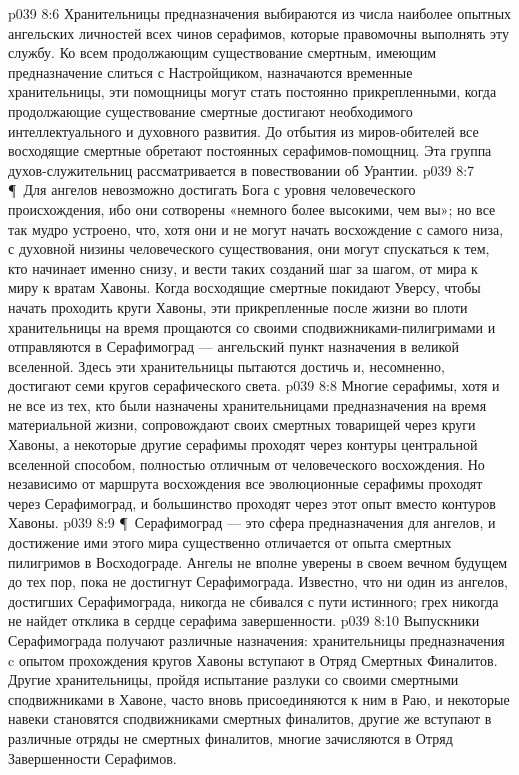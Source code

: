 \vs p039 8:6 Хранительницы предназначения выбираются из числа наиболее опытных ангельских личностей всех чинов серафимов, которые правомочны выполнять эту службу. Ко всем продолжающим существование смертным, имеющим предназначение слиться с Настройщиком, назначаются временные хранительницы, эти помощницы могут стать постоянно прикрепленными, когда продолжающие существование смертные достигают необходимого интеллектуального и духовного развития. До отбытия из миров\hyp{}обителей все восходящие смертные обретают постоянных серафимов\hyp{}помощниц. Эта группа духов\hyp{}служительниц рассматривается в повествовании об Урантии.
\vs p039 8:7 \P\ Для ангелов невозможно достигать Бога с уровня человеческого происхождения, ибо они сотворены «немного более высокими, чем вы»; но все так мудро устроено, что, хотя они и не могут начать восхождение с самого низа, с духовной низины человеческого существования, они могут спускаться к тем, кто начинает именно снизу, и вести таких созданий шаг за шагом, от мира к миру к вратам Хавоны. Когда восходящие смертные покидают Уверсу, чтобы начать проходить круги Хавоны, эти прикрепленные после жизни во плоти хранительницы на время прощаются со своими сподвижниками\hyp{}пилигримами и отправляются в Серафимоград --- ангельский пункт назначения в великой вселенной. Здесь эти хранительницы пытаются достичь и, несомненно, достигают семи кругов серафического света.
\vs p039 8:8 Многие серафимы, хотя и не все из тех, кто были назначены хранительницами предназначения на время материальной жизни, сопровождают своих смертных товарищей через круги Хавоны, а некоторые другие серафимы проходят через контуры центральной вселенной способом, полностью отличным от человеческого восхождения. Но независимо от маршрута восхождения все эволюционные серафимы проходят через Серафимоград, и большинство проходят через этот опыт вместо контуров Хавоны.
\vs p039 8:9 \P\ Серафимоград --- это сфера предназначения для ангелов, и достижение ими этого мира существенно отличается от опыта смертных пилигримов в Восходограде. Ангелы не вполне уверены в своем вечном будущем до тех пор, пока не достигнут Серафимограда. Известно, что ни один из ангелов, достигших Серафимограда, никогда не сбивался с пути истинного; грех никогда не найдет отклика в сердце серафима завершенности.
\vs p039 8:10 Выпускники Серафимограда получают различные назначения: хранительницы предназначения c опытом прохождения кругов Хавоны вступают в Отряд Смертных Финалитов. Другие хранительницы, пройдя испытание разлуки со своими смертными сподвижниками в Хавоне, часто вновь присоединяются к ним в Раю, и некоторые навеки становятся сподвижниками смертных финалитов, другие же вступают в различные отряды не смертных финалитов, многие зачисляются в Отряд Завершенности Серафимов.
